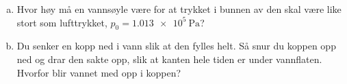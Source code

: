 %
\begin{enumerate}[a)]
    \item Hvor høy må en vannsøyle være for at trykket i bunnen av den skal være like stort som lufttrykket, $p_0 = \SI{1.013e5}{\pascal}$?
    \item Du senker en kopp ned i vann slik at den fylles helt. Så snur du koppen opp ned og drar den sakte opp, slik at kanten hele tiden er under vannflaten. Hvorfor blir vannet med opp i koppen?
\end{enumerate}
%
